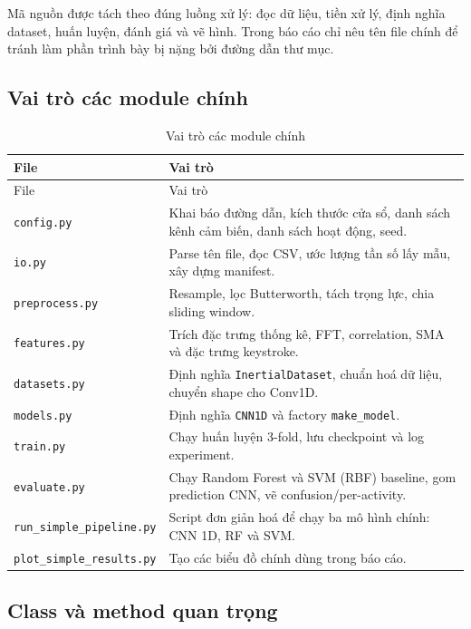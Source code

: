 \documentclass[12pt,a4paper]{article}
\begin{document}
Mã nguồn được tách theo đúng luồng xử lý: đọc dữ liệu, tiền xử lý, định nghĩa dataset, huấn luyện, đánh giá và vẽ hình. Trong báo cáo chỉ nêu tên file chính để tránh làm phần trình bày bị nặng bởi đường dẫn thư mục.

\subsection{Vai trò các module chính}

\begin{longtable}{P{0.34\textwidth}P{0.56\textwidth}}
\caption{Vai trò các module chính} \\
\toprule
File & Vai trò \\
\midrule
\endfirsthead
\toprule
File & Vai trò \\
\midrule
\endhead
\texttt{config.py} & Khai báo đường dẫn, kích thước cửa sổ, danh sách kênh cảm biến, danh sách hoạt động, seed. \\
\texttt{io.py} & Parse tên file, đọc CSV, ước lượng tần số lấy mẫu, xây dựng manifest. \\
\texttt{preprocess.py} & Resample, lọc Butterworth, tách trọng lực, chia sliding window. \\
\texttt{features.py} & Trích đặc trưng thống kê, FFT, correlation, SMA và đặc trưng keystroke. \\
\texttt{datasets.py} & Định nghĩa \texttt{InertialDataset}, chuẩn hoá dữ liệu, chuyển shape cho Conv1D. \\
\texttt{models.py} & Định nghĩa \texttt{CNN1D} và factory \texttt{make\_model}. \\
\texttt{train.py} & Chạy huấn luyện 3-fold, lưu checkpoint và log experiment. \\
\texttt{evaluate.py} & Chạy Random Forest và SVM (RBF) baseline, gom prediction CNN, vẽ confusion/per-activity. \\
\texttt{run\_simple\_pipeline.py} & Script đơn giản hoá để chạy ba mô hình chính: CNN 1D, RF và SVM. \\
\texttt{plot\_simple\_results.py} & Tạo các biểu đồ chính dùng trong báo cáo. \\
\bottomrule
\end{longtable}

\subsection{Class và method quan trọng}
\end{document}
